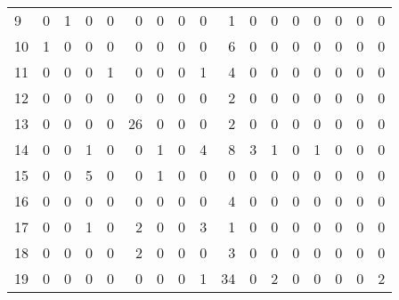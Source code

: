 \begin{tabular}{lrrrrrrrrrrrrrrrr}
9        &          0 &              1 &    0 &           0 &               0 &            0 &      0 &        0 &      1 &    0 &    0 &         0 &           0 &       0 &         0 &       0 \\
10       &          1 &              0 &    0 &           0 &               0 &            0 &      0 &        0 &      6 &    0 &    0 &         0 &           0 &       0 &         0 &       0 \\
11       &          0 &              0 &    0 &           1 &               0 &            0 &      0 &        1 &      4 &    0 &    0 &         0 &           0 &       0 &         0 &       0 \\
12       &          0 &              0 &    0 &           0 &               0 &            0 &      0 &        0 &      2 &    0 &    0 &         0 &           0 &       0 &         0 &       0 \\
13       &          0 &              0 &    0 &           0 &              26 &            0 &      0 &        0 &      2 &    0 &    0 &         0 &           0 &       0 &         0 &       0 \\
14       &          0 &              0 &    1 &           0 &               0 &            1 &      0 &        4 &      8 &    3 &    1 &         0 &           1 &       0 &         0 &       0 \\
15       &          0 &              0 &    5 &           0 &               0 &            1 &      0 &        0 &      0 &    0 &    0 &         0 &           0 &       0 &         0 &       0 \\
16       &          0 &              0 &    0 &           0 &               0 &            0 &      0 &        0 &      4 &    0 &    0 &         0 &           0 &       0 &         0 &       0 \\
17       &          0 &              0 &    1 &           0 &               2 &            0 &      0 &        3 &      1 &    0 &    0 &         0 &           0 &       0 &         0 &       0 \\
18       &          0 &              0 &    0 &           0 &               2 &            0 &      0 &        0 &      3 &    0 &    0 &         0 &           0 &       0 &         0 &       0 \\
19       &          0 &              0 &    0 &           0 &               0 &            0 &      0 &        1 &     34 &    0 &    2 &         0 &           0 &       0 &         0 &       2 \\

\end{tabular}

